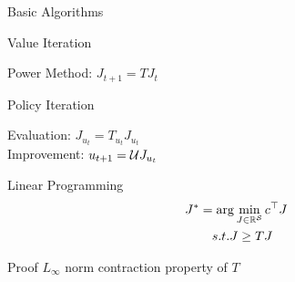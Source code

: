 \documentclass[10pt]{beamer}
\begin{document}
\begin{frame}[fragile]{Basic Algorithms}
\begin{block}{Value Iteration}
\begin{center}
Power Method: $J_{t+1}=T J_t$
\end{center}
\end{block}
\begin{block}{Policy Iteration}
\begin{center}
Evaluation: $J_{u_t}=T_{u_t} J_{u_t}$\\
Improvement: $u_{t+1}=\mathcal{U} J_{u_t}$
\end{center}
\end{block}

\begin{block}{Linear Programming}
\begin{align*}
J^*&=\arg\min_{J\in \mathbb{R}^{\mathcal{S}}} c^\top J\\
&\quad s.t. J\geq TJ
\end{align*}
\end{block}
\begin{center}{Proof}
$L_\infty$ norm contraction property of $T$
\end{center}
\end{frame}
\end{document}
